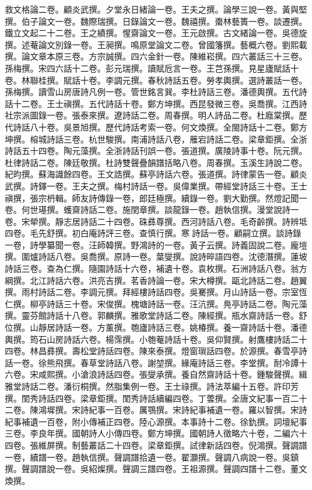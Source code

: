 \begin{pinyinscope}
救文格論二卷。顧炎武撰。夕堂永日緒論一卷。王夫之撰。論學三說一卷。黃與堅撰。伯子論文一卷。魏際瑞撰。日錄論文一卷。魏禧撰。棗林藝簣一卷。談遷撰。鐵立文起二十二卷。王之績撰。惺齋論文一卷。王元啟撰。古文緒論一卷。吳德旋撰。述菴論文別錄一卷。王昶撰。鳴原堂論文二卷。曾國籓撰。藝概六卷。劉熙載撰。論文章本原三卷。方宗誠撰。四六金針一卷。陳維崧撰。四六叢話三十三卷。孫梅撰。宋四六話十二卷。彭元瑞撰。讀賦卮言一卷。王芑孫撰。見星廬賦話十卷。林聯桂撰。賦話十卷。李調元撰。春秋詩話五卷。勞孝輿撰。選詩叢話一卷。孫梅撰。讀雪山房唐詩凡例一卷。管世銘言巽。李杜詩話三卷。潘德輿撰。五代詩話十二卷。王士禛撰。五代詩話十卷。鄭方坤撰。西昆發微三卷。吳喬撰。江西詩社宗派圖錄一卷。張泰來撰。遼詩話二卷。周春撰。明人詩品二卷。杜廕棠撰。歷代詩話八十卷。吳景旭撰。歷代詩話考索一卷。何文煥撰。全閩詩話十二卷。鄭方坤撰。榕城詩話三卷。杭世駿撰。南浦詩話八卷，雁宕詩話二卷。梁章鉅撰。全浙詩話五十四卷。陶元藻撰。全浙詩話刊誤一卷。張道撰。廣陵詩事十卷。阮元撰。杜律詩話二卷。陳廷敬撰。杜詩雙聲疊韻譜括略八卷。周春撰。玉溪生詩說二卷。紀昀撰。蘇海識餘四卷。王文誥撰。蘇亭詩話六卷。張道撰。詩律蒙告一卷。顧炎武撰。詩鐸一卷。王夫之撰。梅村詩話一卷。吳偉業撰。帶經堂詩話三十卷。王士禛撰，張宗枬輯。師友詩傳錄一卷，郎廷極撰。續錄一卷。劉大勤撰。然燈記聞一卷。何世璂撰。蠖齋詩話二卷。施閏章撰。談龍錄一卷。趙執信撰。漫堂說詩一卷。宋犖撰。靜志居詩話二十四卷。硃彞尊撰。西河詩話八卷。毛奇齡撰。詩辨坻四卷。毛先舒撰。初白庵詩評三卷。查慎行撰。寒詩話一卷。顧嗣立撰。談詩錄一卷，詩學纂聞一卷。汪師韓撰。野鴻詩的一卷。黃子云撰。詩義固說二卷。龐塏撰。圍爐詩話八卷。吳喬撰。原詩一卷。葉燮撰。說詩晬語四卷。沈德潛撰。蓮坡詩話三卷。查為仁撰。隨園詩話十六卷，補遺十卷。袁枚撰。石洲詩話八卷。翁方綱撰。北江詩話六卷。洪亮吉撰。茗香詩論一卷。宋大樽撰。甌北詩話二卷。趙翼撰。雨村詩話二卷。李調元撰。拜經樓詩話四卷。吳騫撰。月山詩話一卷。宗室恆仁撰。柳亭詩話三十卷。宋俊撰。槐塘詩話一卷。汪沆撰。鳧亭詩話二卷。陶元藻撰。靈芬館詩話十八卷。郭麟撰。雅歌堂詩話二卷。陳經撰。瓶水齋詩話一卷。舒位撰。山靜居詩話一卷。方薰撰。匏廬詩話三卷。姚椿撰。養一齋詩話十卷。潘德輿撰。筠石山房詩話六卷。楊霈撰。小匏菴詩話十卷。吳仰賢撰。射鷹樓詩話二十四卷。林昌彞撰。壽松堂詩話四卷。陳來泰撰。燈窗瑣話四卷。於源撰。春雪亭詩話一卷。徐熊飛撰。春草堂詩話八卷。謝堃撰。緣庵詩話三卷。李堂撰。耐冷譚十六卷。宋咸熙撰。小滄浪詩話四卷。張燮承撰。養自然齋詩話十卷。鍾駿聲撰。緝雅堂詩話二卷。潘衍桐撰。然脂集例一卷。王士祿撰。詩法萃編十五卷。許印芳撰。閨秀詩話四卷。梁章鉅撰。閨秀詩話續編四卷。丁蕓撰。全唐文紀事一百二十二卷。陳鴻墀撰。宋詩紀事一百卷。厲鶚撰。宋詩紀事補遺一卷。羅以智撰。宋詩紀事補遺一百卷，附小傳補正四卷。陸心源撰。本事詩十二卷。徐釚撰。詞壇紀事三卷。李良年撰。國朝詩人小傳四卷。鄭方坤撰。國朝詩人徵略六十卷，二編六十四卷。張維屏撰。制藝叢話二十四卷。梁章鉅撰。試律新話四卷。倪鴻撰。聲調譜一卷，續譜一卷。趙執信撰。聲調譜拾遺一卷。翟灝撰。聲調八病說一卷。吳鎮撰。聲調譜說一卷。吳紹燦撰。聲調三譜四卷。王祖源撰。聲調四譜十二卷。董文煥撰。


\end{pinyinscope}
